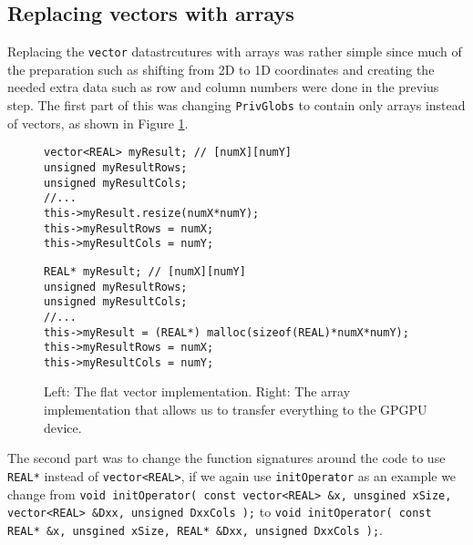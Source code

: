 \subsection{Replacing vectors with arrays}

Replacing the \texttt{vector} datastrcutures with arrays was rather simple since
much of the preparation such as shifting from 2D to 1D coordinates and creating
the needed extra data such as row and column numbers were done in the previus
step. The first part of this was changing \texttt{PrivGlobs} to contain only arrays instead of vectors, as shown in Figure \ref{code:privglobsv2a}.

\begin{figure}[H]
    \begin{minipage}{.45\textwidth}
        \begin{lstlisting}
vector<REAL> myResult; // [numX][numY]
unsigned myResultRows;
unsigned myResultCols;
//...
this->myResult.resize(numX*numY);
this->myResultRows = numX;
this->myResultCols = numY;
        \end{lstlisting}
    \end{minipage}\hfill
    \begin{minipage}{.45\textwidth}
        \begin{lstlisting}
REAL* myResult; // [numX][numY]
unsigned myResultRows;
unsigned myResultCols;
//...
this->myResult = (REAL*) malloc(sizeof(REAL)*numX*numY);
this->myResultRows = numX;
this->myResultCols = numY;
        \end{lstlisting}
    \end{minipage}
    \caption{Left: The flat vector implementation. Right: The array
    implementation that allows us to transfer everything to the GPGPU device.}
    \label{code:privglobsv2a}
\end{figure}

The second part was to change the function signatures around the code to use
\texttt{REAL*} instead of \texttt{vector<REAL>}, if we again use
\texttt{initOperator} as an example we change from \texttt{void initOperator(
const vector<REAL> \&x, unsgined xSize, vector<REAL> \&Dxx, unsigned DxxCols );}
to \texttt{void initOperator(  const REAL* \&x, unsgined xSize, REAL* \&Dxx,
unsigned DxxCols );}.